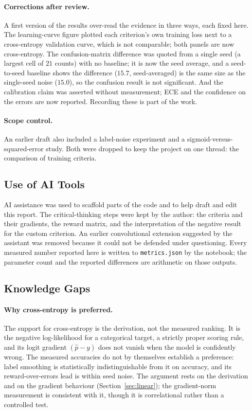 \documentclass[11pt]{article}
\begin{document}
\paragraph{Corrections after review.} A first version of the results over-read the evidence in
three ways, each fixed here. The learning-curve figure plotted each criterion's own training loss
next to a cross-entropy validation curve, which is not comparable; both panels are now
cross-entropy. The confusion-matrix difference was quoted from a single seed (a largest cell of
$21$ counts) with no baseline; it is now the seed average, and a seed-to-seed baseline shows the
difference ($15.7$, seed-averaged) is the same size as the single-seed noise ($15.0$), so the
confusion result is not significant. And the calibration claim was asserted without measurement;
ECE and the confidence on the errors are now reported. Recording these is part of the work.

\paragraph{Scope control.} An earlier draft also included a label-noise experiment and a
sigmoid-versus-squared-error study. Both were dropped to keep the project on one thread: the
comparison of training criteria.

\subsection{Use of AI Tools}

AI assistance was used to scaffold parts of the code and to help draft and edit this report. The
critical-thinking steps were kept by the author: the criteria and their gradients, the reward
matrix, and the interpretation of the negative result for the custom criterion. An earlier
convolutional extension suggested by the assistant was removed because it could not be defended
under questioning. Every measured number reported here is written to \texttt{metrics.json} by
the notebook; the parameter count and the reported differences are arithmetic on those outputs.

\subsection{Knowledge Gaps}

\paragraph{Why cross-entropy is preferred.} The support for cross-entropy is the derivation, not
the measured ranking. It is the negative log-likelihood for a categorical target, a strictly
proper scoring rule, and its logit gradient $(\hat p-y)$ does not vanish when the model is
confidently wrong. The measured accuracies do not by themselves establish a preference: label
smoothing is statistically indistinguishable from it on accuracy, and its reward-over-errors lead
is within seed noise. The argument rests on the derivation and on the gradient behaviour
(Section~\ref{sec:linear}); the gradient-norm measurement is consistent with it, though it is
correlational rather than a controlled test.
\end{document}
